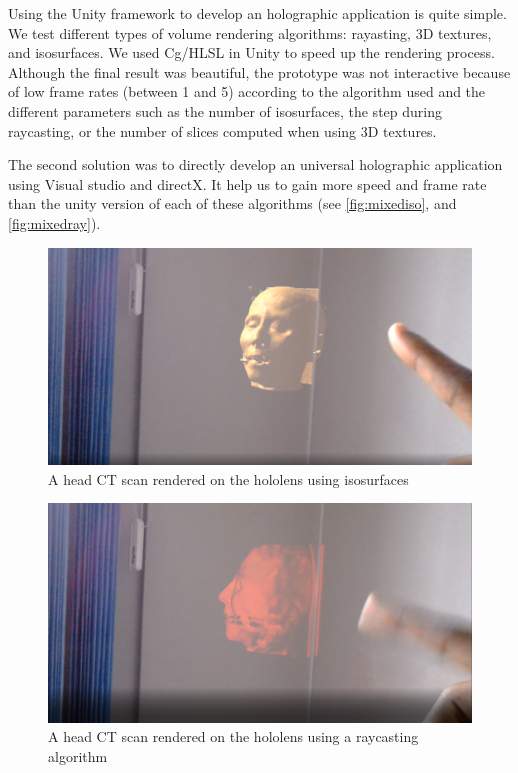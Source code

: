 Using the Unity framework to develop an holographic application is quite simple. We test different types of volume rendering algorithms: rayasting, 3D textures, and isosurfaces.
We used Cg/HLSL in Unity to speed up the rendering process. Although the final result was beautiful, the prototype was not interactive because of low frame rates (between 1 and 5) according to the algorithm used and the different parameters such as the number of isosurfaces, the step during raycasting, or the number of slices computed when using 3D textures.


The second solution was to directly develop an universal holographic application using Visual studio and directX. It help us to gain more speed and frame rate than the unity version of each of these algorithms (see \autoref{fig:mixediso}, and \autoref{fig:mixedray}). 

\begin{figure}
\centering
\includegraphics [width=\textwidth]{Figures/mixediso}
\caption{A head CT scan rendered on the hololens using isosurfaces }
\label{fig:mixediso}
\end{figure}


\begin{figure}
\centering
\includegraphics [width=\textwidth]{Figures/mixedray}
\caption{A head CT scan rendered on the hololens using a raycasting algorithm }
\label{fig:mixedray}
\end{figure}

